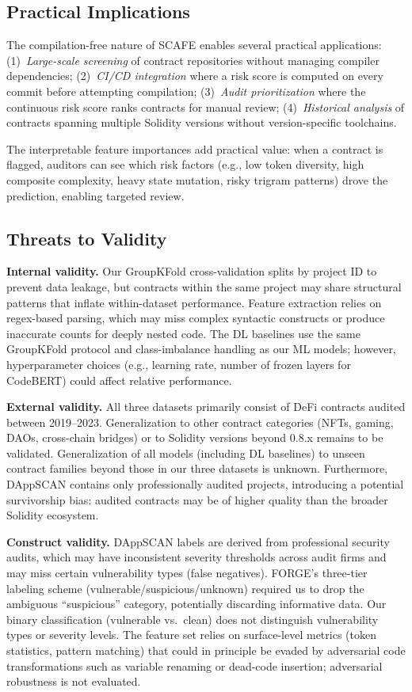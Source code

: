 \documentclass[11pt,a4paper]{article}
\newcommand{\MethodName}{SCAFE\xspace}
\begin{document}
\subsection{Practical Implications}

The compilation-free nature of \MethodName enables several practical applications:
(1)~\emph{Large-scale screening} of contract repositories without managing compiler dependencies;
(2)~\emph{CI/CD integration} where a risk score is computed on every commit before attempting compilation;
(3)~\emph{Audit prioritization} where the continuous risk score ranks contracts for manual review;
(4)~\emph{Historical analysis} of contracts spanning multiple Solidity versions without version-specific toolchains.

The interpretable feature importances add practical value: when a contract is flagged, auditors can see which risk factors (e.g., low token diversity, high composite complexity, heavy state mutation, risky trigram patterns) drove the prediction, enabling targeted review.

\subsection{Threats to Validity}

\textbf{Internal validity.}
Our GroupKFold cross-validation splits by project ID to prevent data leakage, but contracts within the same project may share structural patterns that inflate within-dataset performance.
Feature extraction relies on regex-based parsing, which may miss complex syntactic constructs or produce inaccurate counts for deeply nested code.
The DL baselines use the same GroupKFold protocol and class-imbalance handling as our ML models; however, hyperparameter choices (e.g., learning rate, number of frozen layers for CodeBERT) could affect relative performance.

\textbf{External validity.}
All three datasets primarily consist of DeFi contracts audited between 2019--2023.
Generalization to other contract categories (NFTs, gaming, DAOs, cross-chain bridges) or to Solidity versions beyond 0.8.x remains to be validated.
Generalization of all models (including DL baselines) to unseen contract families beyond those in our three datasets is unknown.
Furthermore, DAppSCAN contains only professionally audited projects, introducing a potential survivorship bias: audited contracts may be of higher quality than the broader Solidity ecosystem.

\textbf{Construct validity.}
DAppSCAN labels are derived from professional security audits, which may have inconsistent severity thresholds across audit firms and may miss certain vulnerability types (false negatives).
FORGE's three-tier labeling scheme (vulnerable/suspicious/unknown) required us to drop the ambiguous ``suspicious'' category, potentially discarding informative data.
Our binary classification (vulnerable vs.\ clean) does not distinguish vulnerability types or severity levels.
The feature set relies on surface-level metrics (token statistics, pattern matching) that could in principle be evaded by adversarial code transformations such as variable renaming or dead-code insertion; adversarial robustness is not evaluated.
\end{document}
